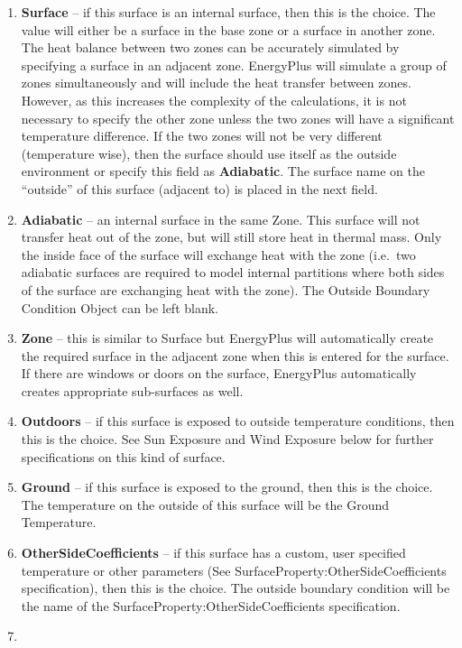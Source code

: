 \begin{enumerate}
  \item
    \textbf{Surface} -- if this surface is an internal surface, then this is the choice. The value will either be a surface in the base zone or a surface in another zone. The heat balance between two zones can be accurately simulated by specifying a surface in an adjacent zone. EnergyPlus will simulate a group of zones simultaneously and will include the heat transfer between zones. However, as this increases the complexity of the calculations, it is not necessary to specify the other zone unless the two zones will have a significant temperature difference. If the two zones will not be very different (temperature wise), then the surface should use itself as the outside environment or specify this field as \textbf{Adiabatic}. The surface name on the ``outside'' of this surface (adjacent to) is placed in the next field.
  \item
    \textbf{Adiabatic} -- an internal surface in the same Zone. This surface will not transfer heat out of the zone, but will still store heat in thermal mass. Only the inside face of the surface will exchange heat with the zone (i.e.~two adiabatic surfaces are required to model internal partitions where both sides of the surface are exchanging heat with the zone). The Outside Boundary Condition Object can be left blank.
  \item
    \textbf{Zone} -- this is similar to Surface but EnergyPlus will automatically create the required surface in the adjacent zone when this is entered for the surface. If there are windows or doors on the surface, EnergyPlus automatically creates appropriate sub-surfaces as well.
  \item
    \textbf{Outdoors} -- if this surface is exposed to outside temperature conditions, then this is the choice. See Sun Exposure and Wind Exposure below for further specifications on this kind of surface.
  \item
    \textbf{Ground} -- if this surface is exposed to the ground, then this is the choice. The temperature on the outside of this surface will be the Ground Temperature.
  \item
    \textbf{OtherSideCoefficients} -- if this surface has a custom, user specified temperature or other parameters (See SurfaceProperty:OtherSideCoefficients specification), then this is the choice. The outside boundary condition will be the name of the SurfaceProperty:OtherSideCoefficients specification.
  \item

\end{enumerate}
